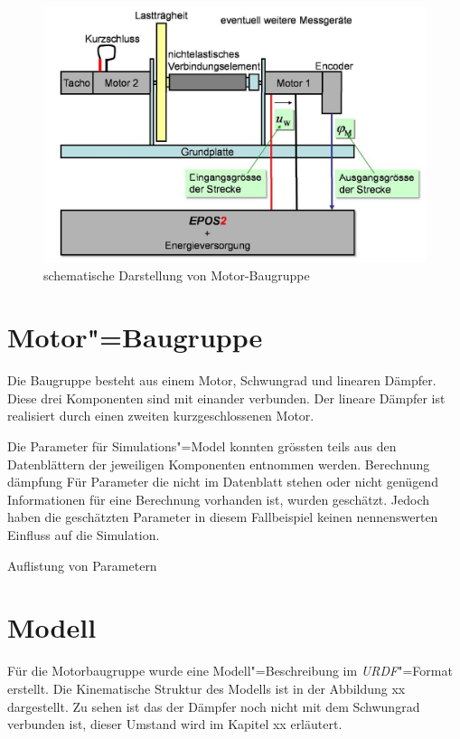 \begin{figure}[ht!]
	\centering
	\includegraphics[width=14.5cm]{images/motor_baugruppe.png} %
	\caption{schematische Darstellung von Motor-Baugruppe}
	\label{Ab:motor-baugruppe}
\end{figure}

\section{Motor"=Baugruppe}
Die Baugruppe besteht aus einem Motor, Schwungrad und linearen Dämpfer.
Diese drei Komponenten sind mit einander verbunden.
Der lineare Dämpfer ist realisiert durch einen zweiten kurzgeschlossenen Motor.

Die Parameter für Simulations"=Model konnten grössten teils aus den Datenblättern der jeweiligen Komponenten entnommen werden. %
Berechnung dämpfung
Für Parameter die nicht im Datenblatt stehen oder nicht genügend Informationen für eine Berechnung vorhanden ist, wurden geschätzt.
Jedoch haben die geschätzten Parameter in diesem Fallbeispiel keinen nennenswerten Einfluss auf die Simulation.

Auflistung von Parametern


\section{Modell}
Für die Motorbaugruppe wurde eine Modell"=Beschreibung im \textit{URDF}"=Format erstellt.
Die Kinematische Struktur des Modells ist in der Abbildung xx dargestellt.
Zu sehen ist das der Dämpfer noch nicht mit dem Schwungrad verbunden ist, dieser Umstand wird im Kapitel xx erläutert. %

